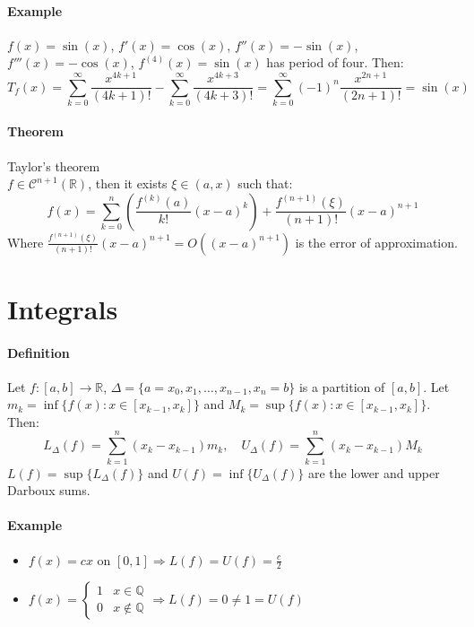 \documentclass{article}
\newcommand{\functoR}[2]{#1 : #2 \rightarrow \mathbb{R}}
\newcommand{\sumn}[1]{\sum_{k=1}^n #1}
\newcommand{\intcc}[1]{\left[#1\right]}
\newcommand{\intoo}[1]{\left(#1\right)}
\newcommand{\Q}{\mathbb{Q}}
\newcommand{\R}{\mathbb{R}}
\newcommand{\C}{\mathcal{C}}
\newcommand{\Def}{\paragraph{Definition}}
\newcommand{\Theorem}{\paragraph{Theorem}}
\newcommand{\Example}{\paragraph{Example}}
\begin{document}
	\Example $f(x) = \sin(x)$, $f'(x) = \cos(x)$, $f''(x) = -\sin(x)$, $f'''(x) =
	-\cos(x)$, $f^{(4)}(x) = \sin(x)$ has period of four. Then:
	\begin{equation*}
		T_f(x) =
		\sum_{k=0}^\infty \frac{x^{4k+1}}{(4k+1)!} -
		\sum_{k=0}^\infty \frac{x^{4k+3}}{(4k+3)!} =
		\sum_{k=0}^\infty (-1)^n \frac{x^{2n+1}}{(2n+1)!} = \sin(x)
	\end{equation*}

	\Theorem Taylor's theorem
\\$f \in \C^{n+1}(\R)$, then it exists $\xi \in \intoo{a,x}$ such that:
	\begin{equation*}
		f(x) =
		\sum_{k=0}^n \left( \frac{f^{(k)}(a)}{k!}(x-a)^k \right) +
		\frac{f^{(n+1)}(\xi)}{(n+1)!}(x-a)^{n+1}
	\end{equation*}
	Where $\frac{f^{(n+1)}(\xi)}{(n+1)!}(x-a)^{n+1} = O((x-a)^{n+1})$ is the error
	of approximation.

\section{Integrals}

	\Def Let $\functoR{f}{\intcc{a,b}}$, $\Delta = \{ a = x_0, x_1, \hdots,
	x_{n-1}, x_n = b \}$ is a partition of $\intcc{a,b}$. Let $m_k =
	\inf \{ f(x) : x \in \intcc{x_{k-1},x_k} \}$ and $M_k =
	\sup \{ f(x) : x \in \intcc{x_{k-1},x_k} \}$. Then:
	\begin{equation*}
		L_\Delta(f) = \sumn (x_k - x_{k-1})m_k, \quad
		U_\Delta(f) = \sumn (x_k - x_{k-1})M_k
	\end{equation*}
	$L(f) = \sup \{ L_\Delta(f) \}$ and $U(f) = \inf \{ U_\Delta(f) \}$ are the
	lower and upper Darboux sums.

	\Example
	\begin{itemize}
		\item $f(x) = cx$ on $\intcc{0,1} \Rightarrow L(f) = U(f) = \frac{c}{2}$
		\item $f(x) = \begin{cases}1 & x \in \Q \\ 0 & x \notin \Q\end{cases}
		\Rightarrow L(f) = 0 \neq 1 = U(f)$
	\end{itemize}
\end{document}

